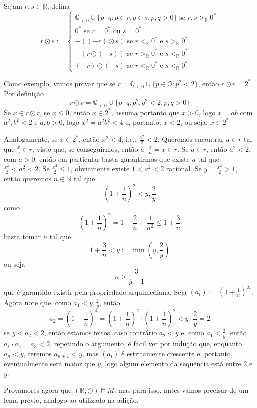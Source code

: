 \documentclass[11pt]{article}
\newcommand{\mbb}[1]{\mathbb{#1}}
\newcommand{\ol}[1]{\overline{#1}}
\newcommand{\rp}[1]{{\left(#1\right)}}
\newcommand{\cl}[1]{\colorlet{shadecolor}{#1}}
\begin{document}
\cl{blue!15}
\begin{shaded}
\begin{definition}
    Sejam $r,s\in\mbb{R}$, defina
    $$r\odot s:=\begin{cases}
        \mbb{Q}_{<0}\cup\{p\cdot q:p\in r, q\in s, p,q>0\}\text{ se }r,s>_\mbb{R}0^*\\
        0^*\text{ se }r=0^*\text{ ou }s=0^*\\
        -((-r)\odot s)\text{ se }r<_\mbb{R}0^*\text{ e }s>_\mbb{R}0^*\\
        -(r\odot(-s))\text{ se }r>_\mbb{R}0^*\text{ e }s<_\mbb{R}0^*\\
        (-r)\odot(-s)\text{ se }r<_\mbb{R}0^*\text{ e }s<_\mbb{R}0^*
    \end{cases}$$
\end{definition}
\end{shaded}

Como exemplo, vamos provar que se $r=\mbb{Q}_{<0}\cup\{p\in\mbb{Q}:p^2<2\}$, então $r\odot r=2^*$. Por definição
$$r\odot r=\mbb{Q}_{<0}\cup\{p\cdot q:p^2,q^2<2, p,q>0\}$$
Se $x\in r\odot r$, se $x\leq0$, então $x\in2^*$, assuma portanto que $x>0$, logo $x=ab$ com $a^2,b^2<2$ e $a,b>0$, logo $x^2=a^2b^2<4$ e, portanto, $x<2$, ou seja, $x\in2^*$.

Analogamente, se  $x\in2^*$, então $x^2<4$, i.e., $\frac{x^2}{2}<2$. Queremos encontrar $a\in r$ tal que $\frac{x}{a}\in r$, visto que, se conseguirmos, então $a\cdot\frac{x}{a}=x\in r$. Se $a\in r$, então $a^2<2$, com $a>0$, então em particular basta garantirmos que existe $a$ tal que $\frac{x^2}{2}<a^2<2$. Se $\frac{x^2}{2}\leq1$, obviamente existe $1<a^2<2$ racional. Se $y=\frac{x^2}{2}>1$, então queremos $n\in\mbb{N}$ tal que
$$\rp{1 + \frac1n}^2<y,\frac2y$$
como
$$\rp{1+\frac1n}^2=1+\frac2n+\frac{1}{n^2}\leq 1+\frac3n$$
basta tomar $n$ tal que
$$1+\frac3n<\ol{y}:=\min\rp{y,\frac2y}$$
ou seja
$$n>\frac{3}{\ol{y}-1}$$
que é garantido existir pela propriedade arquimediana. Seja $(a_i):=\rp{1+\frac1n}^{2i}$. Agora note que, como $a_1<y,\frac2y$, então
$$a_2=\rp{1+\frac1n}^4=\rp{1+\frac1n}^2\cdot\rp{1+\frac1n}^2<y\cdot\frac2y=2$$
se $y<a_2<2$, então estamos feitos, caso contrário $a_2<y$ e, como $a_1<\frac2y$, então $a_1\cdot a_2=a_3<2$, repetindo o argumento, é fácil ver por indução que, enquanto $a_n<y$, teremos $a_{n+1}<y$, mas $(a_i)$ é estritamente crescente e, portanto, eventualmente será maior que $y$, logo algum elemento da sequência está entre $2$ e $y$.

Provamores agora que $(\mbb{R},\odot)\vDash M$, mas para isso, antes vamos precisar de um lema prévio, análogo ao utilizado na adição.
\end{document}

